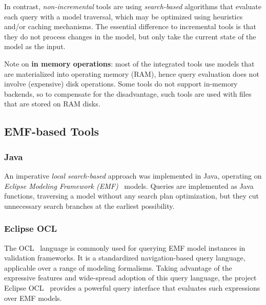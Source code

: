 In contrast, \emph{non-incremental} tools are using \emph{search-based} algorithms that evaluate each query with a model traversal, which may be optimized using heuristics and/or caching mechanisms. The essential difference to incremental tools is that they do not process changes in the model, but only take the current state of the model as the input.

Note on \textbf{in memory operations}: most of the integrated tools use models that are materialized into operating memory (RAM), hence query evaluation does not involve (expensive) disk operations. Some tools do not support in-memory backends, so to compensate for the disadvantage, such tools are used with files that are stored on RAM disks.

\subsection{EMF-based Tools}

\subsubsection{Java}
An imperative \emph{local search-based} approach was implemented in Java, operating on \emph{Eclipse Modeling Framework (EMF)}~\cite{EMF} models. Queries are implemented as Java functions, traversing a model without any search plan optimization, but they cut unnecessary search branches at the earliest possibility.

\subsubsection{Eclipse OCL}

The OCL~\cite{OCL} language is commonly used for querying EMF model instances in validation frameworks. It is a standardized navigation-based query language, applicable over a range of modeling formalisms. Taking advantage of the expressive features and wide-spread adoption of this query language, the project Eclipse OCL~\cite{EclipseOCL} provides a powerful query interface that evaluates such expressions over EMF models.


